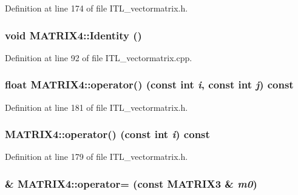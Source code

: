Definition at line 174 of file ITL\_\-vectormatrix.h.

\hypertarget{classMATRIX4_a1140fdbe58cd646997db65e742d21739}{
\subsubsection[{Identity}]{\setlength{\rightskip}{0pt plus 5cm}void MATRIX4::Identity ()}}
\label{classMATRIX4_a1140fdbe58cd646997db65e742d21739}


Definition at line 92 of file ITL\_\-vectormatrix.cpp.

\hypertarget{classMATRIX4_af31bcf17f6a09d2c14ca7e84f73728f3}{
\subsubsection[{operator()}]{\setlength{\rightskip}{0pt plus 5cm}float MATRIX4::operator() (const int {\em i}, \/  const int {\em j}) const}}
\label{classMATRIX4_af31bcf17f6a09d2c14ca7e84f73728f3}


Definition at line 181 of file ITL\_\-vectormatrix.h.

\hypertarget{classMATRIX4_aab1a056c9199cf7c956ffa17a1607033}{
\subsubsection[{operator()}]{ MATRIX4::operator() (const int {\em i}) const}}
\label{classMATRIX4_aab1a056c9199cf7c956ffa17a1607033}


Definition at line 179 of file ITL\_\-vectormatrix.h.

\hypertarget{classMATRIX4_a0eab7ae1f433432b3e931c08c74d6410}{
\subsubsection[{operator=}]{\& MATRIX4::operator= (const {\bf MATRIX3} \& {\em m0})}}
\label{classMATRIX4_a0eab7ae1f433432b3e931c08c74d6410}


